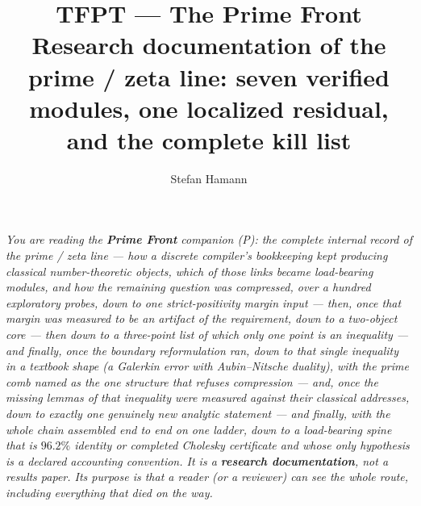 \documentclass[11pt,a4paper]{article}
\title{\vspace{-1.2cm}\textbf{TFPT --- The Prime Front}\\[2mm]
\large Research documentation of the prime / zeta line: seven verified modules,
one localized residual, and the complete kill list}
\author{Stefan Hamann}\date{\TFPTdatestamp}
\begin{document}
\maketitle


\noindent\emph{You are reading the \textbf{Prime Front} companion (P): the complete internal record
of the prime / zeta line --- how a discrete compiler's bookkeeping kept producing classical
number-theoretic objects, which of those links became load-bearing modules, and how the remaining
question was compressed, over a hundred exploratory probes, down to one strict-positivity margin
input --- then, once that margin was measured to be an artifact of the requirement, down to a
two-object core --- then down to a three-point list of which only one point is an
inequality --- and finally, once the boundary reformulation ran, down to that single inequality
in a textbook shape (a Galerkin error with Aubin--Nitsche duality), with the prime comb named as
the one structure that refuses compression --- and, once the missing lemmas of that inequality
were measured against their classical addresses, down to exactly one genuinely new analytic
statement --- and finally, with the whole chain assembled end to end on one ladder, down to a
load-bearing spine that is $96.2\%$ identity or completed Cholesky certificate and whose only
hypothesis is a declared accounting convention. It is a
\textbf{research documentation}, not a results paper. Its purpose is that a reader (or a reviewer)
can see the whole route, including everything that died on the way.}
\end{document}
